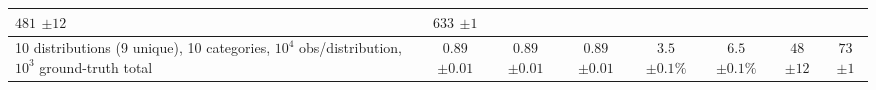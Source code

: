\begin{table*}
\begin{center}
\begin{scriptsize}
\begin{sc}
\begin{tabular}{l||c|c|c||c|c||c|c}
\makecell{$481$\\$\pm 12$} & \makecell{$633$\\$\pm 1$} \\
\hline
\makecell{10 distributions (9 unique), 10 categories,\\$10^4$ obs/distribution, $10^3$ ground-truth total} & 
\makecell{$0.89$\\$\pm 0.01$} & \makecell{$0.89$\\$\pm 0.01$} & \makecell{$0.89$\\$\pm 0.01$} & 
\makecell{$3.5$\\$\pm 0.1\%$} & \makecell{$6.5$\\$\pm 0.1\%$} & 
\makecell{$48$\\$\pm 12$} & \makecell{$73$\\$\pm 1$} \\
\hline

\end{tabular}
\end{sc}
\end{scriptsize}
\end{center}
\vskip -0.1in
\end{table*}
